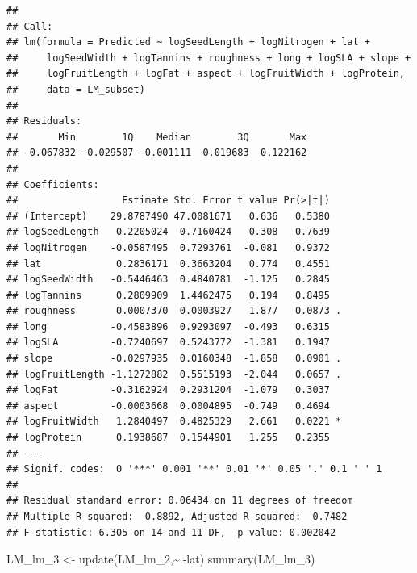 \documentclass[
  12pt,
]{article}
\newenvironment{Shaded}{\begin{snugshade}}{\end{snugshade}}
\newcommand{\FunctionTok}[1]{\textcolor[rgb]{0.00,0.00,0.00}{#1}}
\newcommand{\NormalTok}[1]{#1}
\newcommand{\OtherTok}[1]{\textcolor[rgb]{0.56,0.35,0.01}{#1}}
\newcommand{\SpecialCharTok}[1]{\textcolor[rgb]{0.00,0.00,0.00}{#1}}
\begin{document}
\begin{verbatim}
## 
## Call:
## lm(formula = Predicted ~ logSeedLength + logNitrogen + lat + 
##     logSeedWidth + logTannins + roughness + long + logSLA + slope + 
##     logFruitLength + logFat + aspect + logFruitWidth + logProtein, 
##     data = LM_subset)
## 
## Residuals:
##       Min        1Q    Median        3Q       Max 
## -0.067832 -0.029507 -0.001111  0.019683  0.122162 
## 
## Coefficients:
##                  Estimate Std. Error t value Pr(>|t|)  
## (Intercept)    29.8787490 47.0081671   0.636   0.5380  
## logSeedLength   0.2205024  0.7160424   0.308   0.7639  
## logNitrogen    -0.0587495  0.7293761  -0.081   0.9372  
## lat             0.2836171  0.3663204   0.774   0.4551  
## logSeedWidth   -0.5446463  0.4840781  -1.125   0.2845  
## logTannins      0.2809909  1.4462475   0.194   0.8495  
## roughness       0.0007370  0.0003927   1.877   0.0873 .
## long           -0.4583896  0.9293097  -0.493   0.6315  
## logSLA         -0.7240697  0.5243772  -1.381   0.1947  
## slope          -0.0297935  0.0160348  -1.858   0.0901 .
## logFruitLength -1.1272882  0.5515193  -2.044   0.0657 .
## logFat         -0.3162924  0.2931204  -1.079   0.3037  
## aspect         -0.0003668  0.0004895  -0.749   0.4694  
## logFruitWidth   1.2840497  0.4825329   2.661   0.0221 *
## logProtein      0.1938687  0.1544901   1.255   0.2355  
## ---
## Signif. codes:  0 '***' 0.001 '**' 0.01 '*' 0.05 '.' 0.1 ' ' 1
## 
## Residual standard error: 0.06434 on 11 degrees of freedom
## Multiple R-squared:  0.8892, Adjusted R-squared:  0.7482 
## F-statistic: 6.305 on 14 and 11 DF,  p-value: 0.002042
\end{verbatim}

\begin{Shaded}
\begin{Highlighting}[]
\NormalTok{LM\_lm\_3 }\OtherTok{\textless{}{-}} \FunctionTok{update}\NormalTok{(LM\_lm\_2,}\SpecialCharTok{\textasciitilde{}}\NormalTok{.}\SpecialCharTok{{-}}\NormalTok{lat)}
\FunctionTok{summary}\NormalTok{(LM\_lm\_3)}
\end{Highlighting}
\end{Shaded}
\end{document}
